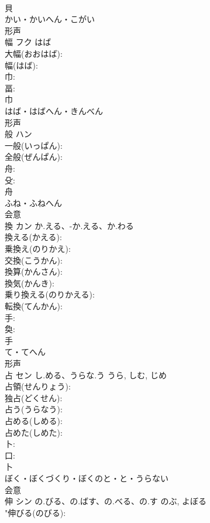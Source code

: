 \documentclass[8pt]{extreport}
\begin{document}
\begin{CJK}{UTF8}{min}
\\	貝	
\\	かい・かいへん・こがい	
\\	形声 
\\	幅	フク	はば		
\\	大幅(おおはば): 
\\	幅(はば): 
\\	巾: 
\\	畐: 
\\	巾	
\\	はば・はばへん・きんべん	
\\	形声 
\\	般	ハン			
\\	一般(いっぱん): 
\\	全般(ぜんぱん): 
\\	舟: 
\\	殳: 
\\	舟	
\\	ふね・ふねへん	
\\	会意 
\\	換	カン	か.える、-か.える、か.わる		
\\	換える(かえる): 
\\	乗換え(のりかえ): 
\\	交換(こうかん): 
\\	換算(かんさん): 
\\	換気(かんき): 
\\	乗り換える(のりかえる): 
\\	転換(てんかん): 
\\	手: 
\\	奐: 
\\	手	
\\	て・てへん	
\\	形声 
\\	占	セン	し.める、うらな.う	うら, しむ, じめ	
\\	占領(せんりょう): 
\\	独占(どくせん): 
\\	占う(うらなう): 
\\	占める(しめる): 
\\	占めた(しめた): 
\\	卜: 
\\	口: 
\\	卜	
\\	ぼく・ぼくづくり・ぼくのと・と・うらない	
\\	会意 
\\	伸	シン	の.びる、の.ばす、の.べる、の.す	のぶ, よぼる	
\\	"伸びる(のびる): 

\end{CJK}
\end{document}
